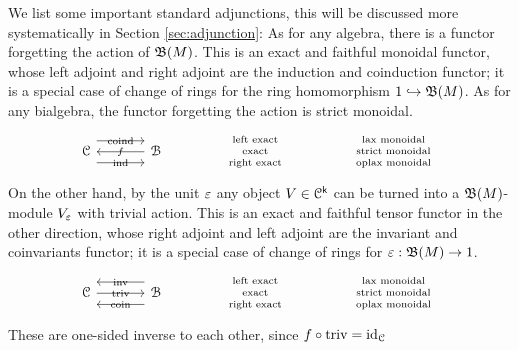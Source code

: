\documentclass[a4paper, reqno]{amsart}
\theoremstyle{introTheorems}
\newcommand\cB{\mathcal{B}}
\newcommand\cC{\mathcal{C}}
\newcommand\id{\textup{id}}
\newcommand\triv{\textup{triv}}
\renewcommand{\1}{\mathbbold{1}}
\begin{document}
We list some important standard adjunctions, this will be discussed more systematically in Section \ref{sec:adjunction}: As for any algebra,  there is a functor forgetting the action of $\mathfrak{B}(M)$. This is an exact and faithful monoidal functor, whose left adjoint and right adjoint are the induction and coinduction functor; it is a special case of change of rings for the ring homomorphism $1\hookrightarrow \mathfrak{B}(M)$. As for any bialgebra, the functor forgetting the action is strict monoidal. 
%
\[\begin{tikzcd}[row sep=6ex, column sep=8ex]
{
\renewcommand{\arraystretch}{0.7}
\cC
\arrow[r, rightarrow, shift right=-8pt,"\mathrm{coind}"{pos=0.5, anchor=center, inner sep=0pt}] 
\arrow[r, leftarrow, shift right=0pt,"\forget"{pos=0.5, anchor=center, inner sep=0pt}]
\arrow[r,rightarrow, shift right=8pt,"\mathrm{ind}"{pos=0.5, anchor=center, inner sep=0pt}] 
}
& 
\cB
&
\begin{array}{c}
    \scriptstyle \textnormal{left exact}\\
    \scriptstyle \textnormal{exact} \\
    \scriptstyle \textnormal{right exact}
\end{array}
&
\begin{array}{c}
    \scriptstyle \textnormal{lax monoidal} \\
    \scriptstyle \textnormal{strict monoidal}\\
    \scriptstyle \textnormal{oplax monoidal}
\end{array}
\end{tikzcd}\]
%
On the other hand, by the unit $\varepsilon$ any object $V\in \cC^\k$ can be turned into a $\mathfrak{B}(M)$-module $V_\varepsilon$ with trivial action. This is an exact and faithful tensor functor in the other direction, whose right adjoint and left adjoint are the invariant and coinvariants functor; it is a special case of change of rings for $\varepsilon:\mathfrak{B}(M)\to 1$.
%
\[\begin{tikzcd}[row sep=6ex, column sep=8ex]
{
\renewcommand{\arraystretch}{0.7}
\cC
\arrow[r, leftarrow, shift right=-8pt,"\mathrm{inv}"{pos=0.5, anchor=center, inner sep=0pt}] 
\arrow[r, rightarrow, shift right=0pt,"\mathrm{triv}"{pos=0.5, anchor=center, inner sep=0pt}]
\arrow[r,leftarrow, shift right=8pt,"\mathrm{coin}"{pos=0.5, anchor=center, inner sep=0pt}] 
}
& 
\cB
&
\begin{array}{c}
    \scriptstyle \textnormal{left exact}\\
    \scriptstyle \textnormal{exact} \\
    \scriptstyle \textnormal{right exact}
\end{array}
&
\begin{array}{c}
    \scriptstyle \textnormal{lax monoidal} \\
    \scriptstyle \textnormal{strict monoidal}\\
    \scriptstyle \textnormal{oplax monoidal}
\end{array}
\end{tikzcd}\]
%
These are one-sided inverse to each other, since $\forget\circ\triv=\id_\cC$
\end{document}
